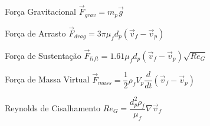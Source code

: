 \documentclass{beamer}
\begin{document}
\begin{frame}
  \frametitle{\subsecname}
  
  \begin{minipage}{.45\textwidth}
    \begin{block}{Força Gravitacional}
      \centering
      $\vec{F}_{grav} = m_p \vec{g}$
    \end{block}
    
    \begin{block}{Força de Arrasto}
      \centering
      $\vec{F}_{drag} = 3 \pi \mu_f d_p \left(\vec{v}_{f} - \vec{v}_{p} \right)$
    \end{block}
    
  \end{minipage}
  \hfill
  \begin{minipage}{.51\textwidth}
    \begin{block}{Força de Sustentação}
      \centering
      $\vec{F}_{lift} = 1.61 \mu_f d_p \left(\vec{v}_{f} - \vec{v}_{p} \right) \sqrt{{Re}_G}$
    \end{block}
    
    \begin{block}{Força de Massa Virtual}
      \centering
      $\vec{F}_{mass} = \dfrac{1}{2} \rho_f V_p \dfrac{d}{dt}\left(\vec{v}_{f} - \vec{v}_{p} \right)$
    \end{block}
    
  \end{minipage}
  
  \begin{block}{Reynolds de Cisalhamento}
    \centering
    $Re_G = \dfrac{d_p^2 \rho_f}{\mu_f} \nabla \vec{v}_f$
  \end{block}
  
\end{frame}
\end{document}
